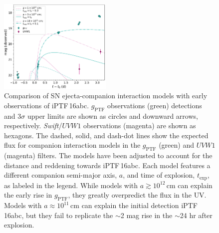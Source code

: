 \documentclass[twocolumn]{aastex61}
\newcommand{\abc}{iPTF\,16abc}
\begin{document}
\begin{figure}[!thb]
  \centering
  \includegraphics[width=0.48\textwidth]{companion_lc.pdf}
  \caption{Comparison of SN ejecta-companion interaction models 
  with early observations of \abc. $g_\mathrm{PTF}$ observations 
  (green) detections and 3$\sigma$ upper limits are shown 
  as circles and downward arrows, respectively. 
  \textit{Swift}/$UVW1$ observations (magenta) are shown as hexagons.
  The dashed, solid, and dash-dot lines show the expected flux 
  for companion interaction models in the $g_\mathrm{PTF}$ (green) 
  and $UVW1$ (magenta) filters. The models have been adjusted to 
  account for the distance and reddening towards \abc. Each 
  model features a different companion semi-major axis, $a$, and 
  time of explosion, $t_\mathrm{exp}$, as labeled in the 
  legend. While models with $a \gtrsim 10^{12} \, \mathrm{cm}$ can 
  explain the early rise in $g_\mathrm{PTF}$, they greatly 
  overpredict the flux in the UV. Models with $a \approx 10^{11} \, 
  \mathrm{cm}$ can explain the initial detection \abc, but they 
  fail to replicate the $\sim$2 mag rise in the $\sim$24 hr after 
  explosion.
  }
  \label{fig:SN-companion}
\end{figure}
\end{document}
